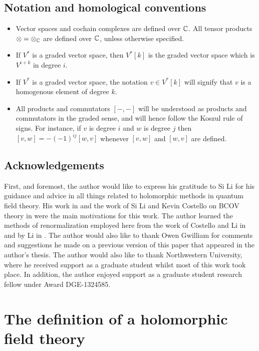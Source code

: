 \documentclass[10pt]{amsart}
\def\brian{\textcolor{blue}{BW: }\textcolor{blue}}
\begin{document}
\subsection*{Notation and homological conventions}

\begin{itemize}
\item Vector spaces and cochain complexes are defined over $\mathbb C$. 
All tensor products $\otimes = \otimes_{\mathbb C}$ are defined over $\mathbb C$, unless otherwise specified. 
\item If $V^*$ is a graded vector space, then $V^*[k]$ is the graded vector space which is $V^{i + k}$ in degree $i$. 
\item If $V^*$ is a graded vector space, the notation $v \in V^* [k]$ will signify that $v$ is a homogenous element of degree $k$.

\item All products and commutators $[-,-]$ will be understood as products and commutators in the graded sense, and will hence follow the Koszul rule of signs. 
For instance, if $v$ is degree $i$ and $w$ is degree $j$ then $[v,w] = -(-1)^{ij} [w,v]$ whenever $[v,w]$ and $[w,v]$ are defined. 


\end{itemize} 
\subsection{Acknowledgements}

First, and foremost, the author would like to express his gratitude to Si Li for his guidance and advice in all things related to holomorphic methods in quantum field theory. 
His work in \cite{LiFeynman} and the work of Si Li and Kevin Costello on BCOV theory in \cite{bcov} were the main motivations for this work. 
The author learned the methods of renormalization employed here from the work of Costello and Li in \cite{bcov} and by Li in \cite{LiFeynman}.
The author would also like to thank Owen Gwilliam for comments and suggestions he made on a previous version of this paper that appeared in the author's thesis. 
The author would also like to thank Northwestern University, where he received support as a graduate student whilst most of this work took place. 
In addition, the author enjoyed support as a graduate student research fellow under Award DGE-1324585. 
 
\section{The definition of a holomorphic field theory}
\end{document}
